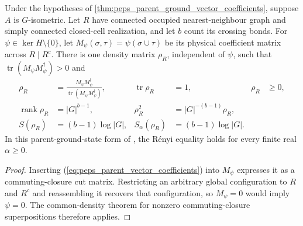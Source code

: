 \begin{lemma}%
    \label{thm:peps_parent_ground_state_density}
    \leanok
    Under the hypotheses of \ref{thm:peps_parent_ground_vector_coefficients},
    suppose $A$ is $G$-isometric. Let $R$ have connected occupied
    nearest-neighbour graph and simply connected closed-cell realization,
    and let $b$ count its crossing bonds. For $\psi\in\ker H\setminus\{0\}$,
    let $M_\psi(\sigma,\tau)=\psi(\sigma\cup\tau)$ be its physical
    coefficient matrix across $R\mid R^c$.
    There is one density matrix $\rho_R$, independent of $\psi$, such that
    $\operatorname{tr}(M_\psi M_\psi^\dagger)>0$ and
    \begin{align}
        \rho_R                    & =\frac{M_\psi M_\psi^\dagger}
        {\operatorname{tr}(M_\psi M_\psi^\dagger)},
                                  & \operatorname{tr}\rho_R       & =1,
                                  & \rho_R                        & \geq0,               \\
        \operatorname{rank}\rho_R & =|G|^{b-1},
                                  & \rho_R^2                      & =|G|^{-(b-1)}\rho_R, \\
        S(\rho_R)                 & =(b-1)\log|G|,
                                  & S_\alpha(\rho_R)              & =(b-1)\log|G|.
    \end{align}
    In this parent-ground-state form of \cite[Theorem~6.9]{Schuch2010PEPS},
    the R\'enyi equality holds for every finite real $\alpha\geq0$.
\end{lemma}
\begin{proof}\leanok
    Inserting (\ref{eq:peps_parent_vector_coefficients}) into $M_\psi$ expresses it as a commuting-closure cut matrix.
    Restricting an arbitrary global configuration to $R$ and $R^c$
    and reassembling it recovers that configuration, so $M_\psi=0$
    would imply $\psi=0$. The common-density theorem for nonzero
    commuting-closure superpositions therefore applies.
\end{proof}

